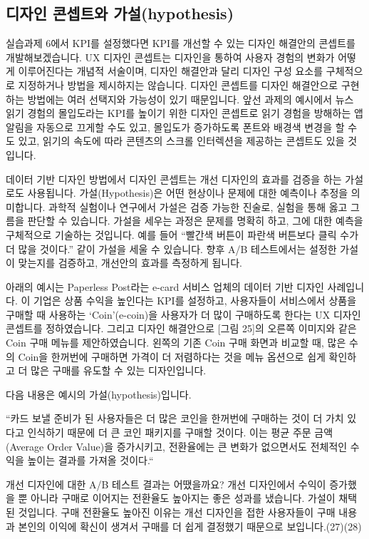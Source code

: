 \documentclass[
  letterpaper,
]{book}
\begin{document}
\subsection{디자인 콘셉트와
가설(hypothesis)}\label{uxb514uxc790uxc778-uxcf58uxc149uxd2b8uxc640-uxac00uxc124hypothesis}

실습과제 6에서 KPI를 설정했다면 KPI를 개선할 수 있는 디자인 해결안의
콘셉트를 개발해보겠습니다. UX 디자인 콘셉트는 디자인을 통하여 사용자
경험의 변화가 어떻게 이루어진다는 개념적 서술이며, 디자인 해결안과 달리
디자인 구성 요소를 구체적으로 지정하거나 방법을 제시하지는 않습니다.
디자인 콘셉트를 디자인 해결안으로 구현하는 방법에는 여러 선택지와
가능성이 있기 때문입니다. 앞선 과제의 예시에서 뉴스 읽기 경험의
몰입도라는 KPI를 높이기 위한 디자인 콘셉트로 읽기 경험을 방해하는 앱
알림을 자동으로 끄게할 수도 있고, 몰입도가 증가하도록 폰트와 배경색
변경을 할 수 도 있고, 읽기의 속도에 따라 콘텐츠의 스크롤 인터렉션을
제공하는 콘셉트도 있을 것입니다.

데이터 기반 디자인 방법에서 디자인 콘셉트는 개선 디자인의 효과를 검증을
하는 가설로도 사용됩니다. 가설(Hypothesis)은 어떤 현상이나 문제에 대한
예측이나 추정을 의미합니다. 과학적 실험이나 연구에서 가설은 검증 가능한
진술로, 실험을 통해 옳고 그름을 판단할 수 있습니다. 가설을 세우는 과정은
문제를 명확히 하고, 그에 대한 예측을 구체적으로 기술하는 것입니다. 예를
들어 ``빨간색 버튼이 파란색 버튼보다 클릭 수가 더 많을 것이다.'' 같이
가설을 세울 수 있습니다. 향후 A/B 테스트에서는 설정한 가설이 맞는지를
검증하고, 개선안의 효과를 측정하게 됩니다.

아래의 예시는 Paperless Post라는 e-card 서비스 업체의 데이터 기반 디자인
사례입니다. 이 기업은 상품 수익을 높인다는 KPI를 설정하고, 사용자들이
서비스에서 상품을 구매할 때 사용하는 `Coin'(e-coin)을 사용자가 더 많이
구매하도록 한다는 UX 디자인 콘셉트를 정하였습니다. 그리고 디자인
해결안으로 {[}그림 25{]}의 오른쪽 이미지와 같은 Coin 구매 메뉴를
제안하였습니다. 왼쪽의 기존 Coin 구매 화면과 비교할 때, 많은 수의 Coin을
한꺼번에 구매하면 가격이 더 저렴하다는 것을 메뉴 옵션으로 쉽게 확인하고
더 많은 구매를 유도할 수 있는 디자인입니다.

다음 내용은 예시의 가설(hypothesis)입니다.

``카드 보낼 준비가 된 사용자들은 더 많은 코인을 한꺼번에 구매하는 것이
더 가치 있다고 인식하기 때문에 더 큰 코인 패키지를 구매할 것이다. 이는
평균 주문 금액(Average Order Value)을 증가시키고, 전환율에는 큰 변화가
없으면서도 전체적인 수익을 높이는 결과를 가져올 것이다.``

개선 디자인에 대한 A/B 테스트 결과는 어땠을까요? 개선 디자인에서 수익이
증가했을 뿐 아니라 구매로 이어지는 전환율도 높아지는 좋은 성과를
냈습니다. 가설이 채택된 것입니다. 구매 전환율도 높아진 이유는 개선
디자인을 접한 사용자들이 구매 내용과 본인의 이익에 확신이 생겨서 구매를
더 쉽게 결정했기 때문으로 보입니다.(27)(28)
\end{document}
